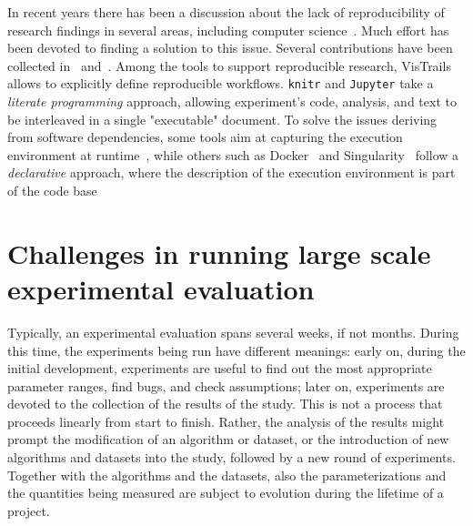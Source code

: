 \documentclass{llncs}
\begin{document}
In recent years there has been a discussion about the lack of reproducibility
of research findings in several areas, including 
computer science~\cite{DBLP:journals/cacm/CollbergP16,Hutson725}.
Much effort has been devoted to finding a solution to this issue. Several
contributions have been collected in~\cite{stodden2014implementing} 
and~\cite{kitzes2017practice}.
Among the tools to support reproducible research, 
VisTrails~\cite{DBLP:conf/sigmod/CallahanFSSSV06} allows to
explicitly define reproducible workflows.
\texttt{knitr} and \texttt{Jupyter} take a \emph{literate programming}
approach, allowing experiment's code, analysis, and text to be interleaved
in a single "executable" document.
To solve the issues deriving from software dependencies,
some tools aim at capturing the execution
environment at runtime~\cite{DBLP:journals/cse/Guo12,davison2014sumatra,DBLP:journals/jossw/RampinCSFS16},
while others such as Docker~\cite{DBLP:journals/sigops/Boettiger15}
and Singularity~\cite{kurtzer2017singularity} follow a \emph{declarative}
approach, where the description of the execution environment is part
of the code base


\section{Challenges in running large scale experimental evaluation}

Typically, an experimental evaluation spans several weeks, if not months.
During this time, the experiments being run have different meanings: early
on, during the initial development, experiments are useful to find out the most
appropriate parameter ranges, find bugs, and check assumptions; later on,
experiments are devoted to the collection of the results of the study.
This is not a process that proceeds linearly from start to finish. 
Rather, the analysis of the results might prompt the modification of an algorithm
or dataset, or the introduction of new algorithms and datasets into the study,
followed by a new round of experiments.
Together with the algorithms and the datasets, also the parameterizations and the
quantities being measured are subject to evolution during the lifetime of a project.
\end{document}
